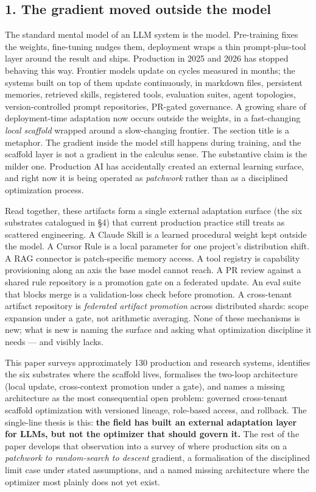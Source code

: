 \subsection{1. The gradient moved outside the
model}\label{the-gradient-moved-outside-the-model}

The standard mental model of an LLM system is the model. Pre-training
fixes the weights, fine-tuning nudges them, deployment wraps a thin
prompt-plus-tool layer around the result and ships. Production in 2025
and 2026 has stopped behaving this way. Frontier models update on cycles
measured in months; the systems built on top of them update
continuously, in markdown files, persistent memories, retrieved skills,
registered tools, evaluation suites, agent topologies,
version-controlled prompt repositories, PR-gated governance. A growing
share of deployment-time adaptation now occurs outside the weights, in a
fast-changing \emph{local scaffold} wrapped around a slow-changing
frontier. The section title is a metaphor. The gradient inside the model
still happens during training, and the scaffold layer is not a gradient
in the calculus sense. The substantive claim is the milder one.
Production AI has accidentally created an external learning surface, and
right now it is being operated as \emph{patchwork} rather than as a
disciplined optimization process.

Read together, these artifacts form a single external adaptation surface
(the six substrates catalogued in §4) that current production practice
still treats as scattered engineering. A Claude Skill is a learned
procedural weight kept outside the model. A Cursor Rule is a local
parameter for one project's distribution shift. A RAG connector is
patch-specific memory access. A tool registry is capability provisioning
along an axis the base model cannot reach. A PR review against a shared
rule repository is a promotion gate on a federated update. An eval suite
that blocks merge is a validation-loss check before promotion. A
cross-tenant artifact repository is \emph{federated artifact promotion}
across distributed shards: scope expansion under a gate, not arithmetic
averaging. None of these mechanisms is new; what is new is naming the
surface and asking what optimization discipline it needs --- and
visibly lacks.

This paper surveys approximately 130 production and research systems,
identifies the six substrates where the scaffold lives, formalises the
two-loop architecture (local update, cross-context promotion under a
gate), and names a missing architecture as the most consequential open
problem: governed cross-tenant scaffold optimization with versioned
lineage, role-based access, and rollback. The single-line thesis is
this: \textbf{the field has built an external adaptation layer for LLMs,
but not the optimizer that should govern it.} The rest of the paper
develops that observation into a survey of where production sits on a
\emph{patchwork to random-search to descent} gradient, a formalisation
of the disciplined limit case under stated assumptions, and a named
missing architecture where the optimizer most plainly does not yet
exist.

